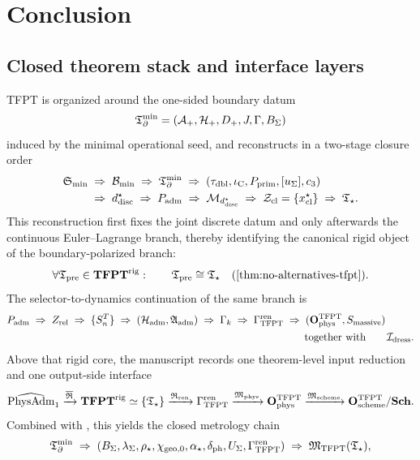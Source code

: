 \section{Conclusion}

\subsection{Closed theorem stack and interface layers}

TFPT is organized around the one-sided boundary datum
\[
\mathfrak T_{\partial}^{\min}=(\mathcal A_+,\mathcal H_+,D_+,J,\Gamma,B_\Sigma)
\]
induced by the minimal operational seed, and reconstructs in a two-stage closure order
\[
\begin{aligned}
\mathfrak S_{\min}
&\;\Rightarrow\;
\mathcal B_{\min}
\;\Rightarrow\;
\mathfrak T_{\partial}^{\min}
\;\Rightarrow\;
(\tau_{\mathrm{dbl}},\iota_{\mathrm C},P_{\mathrm{prim}},[u_\Sigma],c_3)\\
&\;\Rightarrow\;
d^\star_{\mathrm{disc}}
\;\Rightarrow\;
P_{\mathrm{adm}}
\;\Rightarrow\;
\mathcal M_{d^\star_{\mathrm{disc}}}
\;\Rightarrow\;
\mathcal Z_{\mathrm{cl}}=\{x^\star_{\mathrm{cl}}\}
\;\Rightarrow\;
\mathfrak T_{\star}.
\end{aligned}
\]
This reconstruction first fixes the joint discrete datum and only afterwards the continuous
Euler--Lagrange branch, thereby identifying the canonical rigid object of the boundary-polarized
branch:
\[
\forall \Tpre\in\mathbf{TFPT}^{\mathrm{rig}}:\qquad
\Tpre\cong \Tstar
\quad\text{(\Cref{thm:no-alternatives-tfpt})}.
\]
The selector-to-dynamics continuation of the same branch is
\[
P_{\mathrm{adm}}
\;\Rightarrow\;
Z_{\mathrm{rel}}
\;\Rightarrow\;
\{S_n^T\}
\;\Rightarrow\;
(\mathcal H_{\mathrm{adm}},\mathfrak A_{\mathrm{adm}})
\;\Rightarrow\;
\Gamma_k
\;\Rightarrow\;
\begin{aligned}[t]
\Gamma_{\mathrm{TFPT}}^{\mathrm{ren}}
&\;\Rightarrow\;
(\mathbf O_{\mathrm{phys}}^{\mathrm{TFPT}},S_{\mathrm{massive}})\\
&\qquad\text{together with}\qquad
\mathcal I_{\mathrm{dress}}.
\end{aligned}
\]
Above that rigid core, the manuscript records one theorem-level input reduction and one output-side
interface
\[
\widehat{\mathrm{PhysAdm}}_1
\xrightarrow{\overline{\mathfrak R}}
\mathbf{TFPT}^{\mathrm{rig}}
\simeq
\{\mathfrak T_{\star}\}
\xrightarrow{\mathfrak R_{\mathrm{ren}}}
\Gamma_{\mathrm{TFPT}}^{\mathrm{ren}}
\xrightarrow{\mathfrak M_{\mathrm{phys}}}
\mathbf O_{\mathrm{phys}}^{\mathrm{TFPT}}
\xrightarrow{\mathfrak M_{\mathrm{scheme}}}
\mathbf O_{\mathrm{scheme}}^{\mathrm{TFPT}}/\mathbf{Sch}.
\]
Combined with , this yields the closed metrology chain
\[
\mathfrak T_{\partial}^{\min}
\;\Rightarrow\;
(B_\Sigma,\lambda_\Sigma,\rho_\star,\chi_{\mathrm{geo},0},\alpha_\star,\delta_{\mathrm{ph}},U_\Sigma,\Gamma_{\mathrm{TFPT}}^{\mathrm{ren}})
\;\Rightarrow\;
\mathfrak M_{\mathrm{TFPT}}(\mathfrak T_{\star}),
\]
